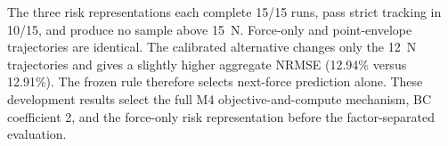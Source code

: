 The three risk representations each complete 15/15 runs, pass strict tracking
in 10/15, and produce no sample above 15~N. Force-only and point-envelope
trajectories are identical. The calibrated alternative changes only the
12~N trajectories and gives a slightly higher aggregate NRMSE (12.94\% versus
12.91\%). The frozen rule therefore selects next-force prediction alone.
These development results select the full M4 objective-and-compute mechanism,
BC coefficient 2, and the force-only risk representation before the
factor-separated evaluation.
